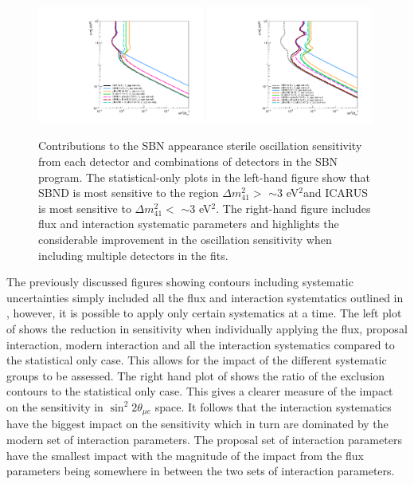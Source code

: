 \begin{figure}[h!]
    \centering
    \includegraphics[width = 0.49\textwidth]{figures-chap6/exclusion_contours/nue_app_detector_combinations_stat_only.pdf}
    \includegraphics[width = 0.49\textwidth]{figures-chap6/exclusion_contours/nue_app_detector_combinations_stat+syst.pdf}
    \caption[\nue appearance sensitivities from different detector combinations.]{Contributions to the SBN \nue appearance sterile oscillation sensitivity from each detector and combinations of detectors in the SBN program. The statistical-only plots in the left-hand figure show that SBND is most sensitive to the region $\Delta m_{41}^{2} >$ $\sim$3 eV$^{2}$and ICARUS is most sensitive to $\Delta m_{41}^{2} <$ $\sim$3 eV$^{2}$. The right-hand figure includes flux and interaction systematic parameters and highlights the considerable improvement in the oscillation sensitivity when including multiple detectors in the fits.}
    \label{fig:nue_sensitivity_detector_contribution}
\end{figure}

The previously discussed figures showing contours including systematic uncertainties simply included all the flux and interaction systemtatics outlined in , however, it is possible to apply only certain systematics at a time. The left plot of   shows the reduction in sensitivity when individually applying the flux, proposal interaction, modern interaction and all the interaction systematics compared to the statistical only case. This allows for the impact of the different systematic groups to be assessed. The right hand plot of  shows the ratio of the exclusion contours to the statistical only case. This gives a clearer measure of the impact on the sensitivity in $\sin^2{2\theta_{\mu e}}$ space. It follows that the interaction systematics have the biggest impact on the sensitivity which in turn are dominated by the modern set of interaction parameters. The proposal set of interaction parameters have the smallest impact with the magnitude of the impact from the flux parameters being somewhere in between the two sets of interaction parameters. 

